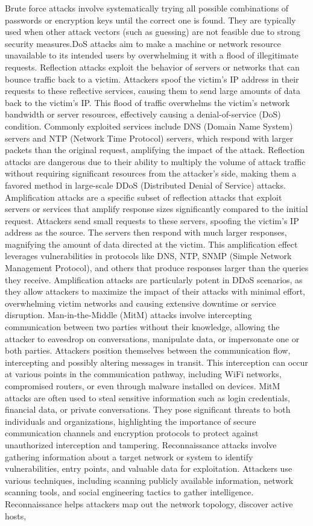 \documentclass{article}
\begin{document}
	Brute force attacks involve systematically trying all possible combinations of passwords or encryption keys until the correct one is found. They are typically used when other attack vectors (such as guessing) are not feasible due to strong security measures.DoS attacks aim to make a machine or network resource unavailable to its intended users by overwhelming it with a flood of illegitimate requests. Reflection attacks exploit the behavior of servers or networks that can bounce traffic back to a victim. Attackers spoof the victim's IP address in their requests to these reflective services, causing them to send large amounts of data back to the victim's IP. This flood of traffic overwhelms the victim's network bandwidth or server resources, effectively causing a denial-of-service (DoS) condition. Commonly exploited services include DNS (Domain Name System) servers and NTP (Network Time Protocol) servers, which respond with larger packets than the original request, amplifying the impact of the attack. Reflection attacks are dangerous due to their ability to multiply the volume of attack traffic without requiring significant resources from the attacker's side, making them a favored method in large-scale DDoS (Distributed Denial of Service) attacks. Amplification attacks are a specific subset of reflection attacks that exploit servers or services that amplify response sizes significantly compared to the initial request. Attackers send small requests to these servers, spoofing the victim's IP address as the source. The servers then respond with much larger responses, magnifying the amount of data directed at the victim. This amplification effect leverages vulnerabilities in protocols like DNS, NTP, SNMP (Simple Network Management Protocol), and others that produce responses larger than the queries they receive. Amplification attacks are particularly potent in DDoS scenarios, as they allow attackers to maximize the impact of their attacks with minimal effort, overwhelming victim networks and causing extensive downtime or service disruption. Man-in-the-Middle (MitM) attacks involve intercepting communication between two parties without their knowledge, allowing the attacker to eavesdrop on conversations, manipulate data, or impersonate one or both parties. Attackers position themselves between the communication flow, intercepting and possibly altering messages in transit. This interception can occur at various points in the communication pathway, including WiFi networks, compromised routers, or even through malware installed on devices. MitM attacks are often used to steal sensitive information such as login credentials, financial data, or private conversations. They pose significant threats to both individuals and organizations, highlighting the importance of secure communication channels and encryption protocols to protect against unauthorized interception and tampering. Reconnaissance attacks involve gathering information about a target network or system to identify vulnerabilities, entry points, and valuable data for exploitation. Attackers use various techniques, including scanning publicly available information, network scanning tools, and social engineering tactics to gather intelligence. Reconnaissance helps attackers map out the network topology, discover active hosts, 
\end{document}
